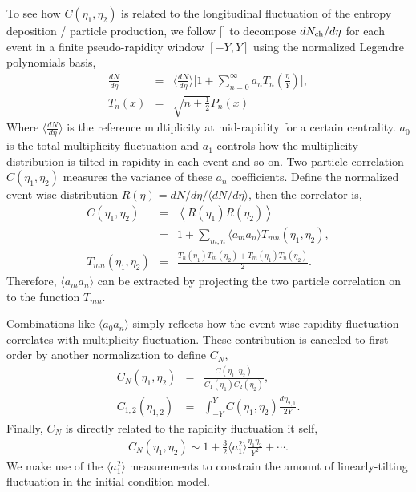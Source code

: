 To see how $C(\eta_1, \eta_2)$ is related to the longitudinal fluctuation of the entropy deposition / particle production, we follow [] to decompose $dN_\text{ch}/d\eta$ for each event in a finite pseudo-rapidity window $[-Y, Y]$ using the normalized Legendre polynomials basis,
\begin{eqnarray}
\frac{dN}{d\eta} &=& \biggl\langle\frac{dN}{d\eta}\biggr\rangle \biggl[1 + \sum_{n=0}^\infty a_n T_n\left(\frac{\eta}{Y}\right) \biggr],\\
T_n(x) &=& \sqrt{n + \frac{1}{2}} P_n(x)
\end{eqnarray}
Where $\langle\frac{dN}{d\eta}\rangle$ is the reference multiplicity at mid-rapidity for a certain centrality.
$a_0$ is the total multiplicity fluctuation and $a_1$ controls how the multiplicity distribution is tilted in rapidity in each event and so on.
Two-particle correlation $C(\eta_1, \eta_2)$ measures the variance of these $a_n$ coefficients.
Define the normalized event-wise distribution $R(\eta) = dN/d\eta /\langle dN/d\eta\rangle$, then the correlator is,
\begin{eqnarray}
C(\eta_1, \eta_2) &=& \left\langle R(\eta_1) R(\eta_2)\right\rangle \\
&=& 1 + \sum_{m, n}\langle a_m a_n\rangle  T_{mn}(\eta_1, \eta_2),\\
T_{mn}(\eta_1, \eta_2) &=& \frac{T_n(\eta_1)T_m(\eta_2) + T_m(\eta_1)T_n(\eta_2)}{2}.
\end{eqnarray}
Therefore, $\langle a_m a_n\rangle$ can be extracted by projecting the two particle correlation on to the function $T_{mn}$.

Combinations like $\langle a_0 a_n\rangle$ simply reflects how the event-wise rapidity fluctuation correlates with multiplicity fluctuation. 
These contribution is canceled to first order by another normalization to define $C_N$,
\begin{eqnarray}
 C_N(\eta_1, \eta_2) &=& \frac{C(\eta_1, \eta_2)}{C_1(\eta_1)C_2(\eta_2)},\\
C_{1,2}(\eta_{1,2}) &=& \int_{-Y}^{Y}C(\eta_1, \eta_2)\frac{d\eta_{2,1}}{2Y}.
\end{eqnarray}
Finally, $C_N$ is directly related to the rapidity fluctuation it self,
\begin{eqnarray}
C_N(\eta_1, \eta_2) \sim 1 + \frac{3}{2}\langle a_1 ^2 \rangle \frac{\eta_1\eta_2}{Y^2} + \cdots.
\end{eqnarray}
We make use of the $\langle a_1 ^2 \rangle$ measurements to constrain the amount of  linearly-tilting fluctuation in the initial condition model.


